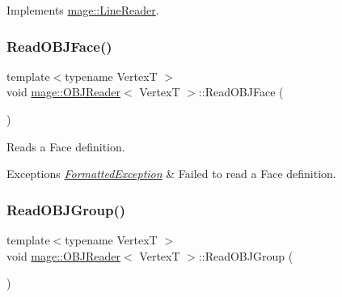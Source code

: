 Implements \hyperlink{classmage_1_1_line_reader_acfb2f7279ec77d070a86d7db812d4745}{mage\+::\+Line\+Reader}.

\hypertarget{classmage_1_1_o_b_j_reader_a647cd7683007f351096702924ce46a3b}{}\label{classmage_1_1_o_b_j_reader_a647cd7683007f351096702924ce46a3b} 
\subsubsection{\texorpdfstring{Read\+O\+B\+J\+Face()}{ReadOBJFace()}}
{\footnotesize\ttfamily template$<$typename VertexT $>$ \\
void \hyperlink{classmage_1_1_o_b_j_reader}{mage\+::\+O\+B\+J\+Reader}$<$ VertexT $>$\+::Read\+O\+B\+J\+Face (\begin{DoxyParamCaption}{ }\end{DoxyParamCaption})\hspace{0.3cm}{\ttfamily [private]}}

Reads a Face definition.


\begin{DoxyExceptions}{Exceptions}
{\em \hyperlink{classmage_1_1_formatted_exception}{Formatted\+Exception}} & Failed to read a Face definition. \\
\hline
\end{DoxyExceptions}
\hypertarget{classmage_1_1_o_b_j_reader_a8159620b12d426073581202fee022662}{}\label{classmage_1_1_o_b_j_reader_a8159620b12d426073581202fee022662} 
\subsubsection{\texorpdfstring{Read\+O\+B\+J\+Group()}{ReadOBJGroup()}}
{\footnotesize\ttfamily template$<$typename VertexT $>$ \\
void \hyperlink{classmage_1_1_o_b_j_reader}{mage\+::\+O\+B\+J\+Reader}$<$ VertexT $>$\+::Read\+O\+B\+J\+Group (\begin{DoxyParamCaption}{ }\end{DoxyParamCaption})\hspace{0.3cm}{\ttfamily [private]}}


